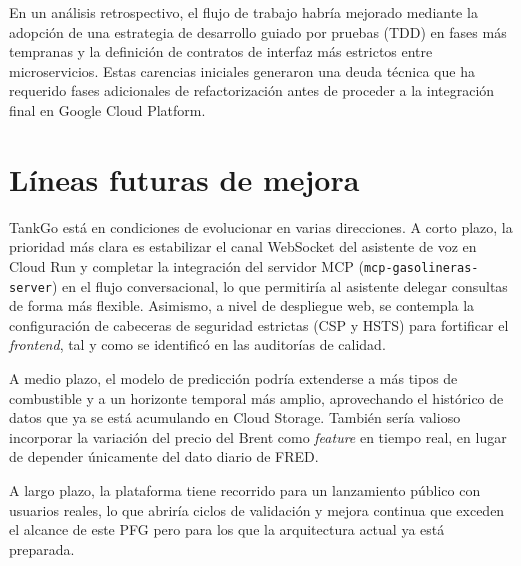 En un análisis retrospectivo, el flujo de trabajo habría mejorado mediante la adopción de una estrategia de desarrollo guiado por pruebas
(TDD) en fases más tempranas y la definición de contratos de interfaz más estrictos entre microservicios. Estas carencias iniciales generaron
una deuda técnica que ha requerido fases adicionales de refactorización antes de proceder a la integración final en Google Cloud Platform.

\section{Líneas futuras de mejora}
\label{sec:lineas-futuras}

TankGo está en condiciones de evolucionar en varias direcciones. A corto plazo, la prioridad más clara es estabilizar el canal WebSocket del
asistente de voz en Cloud Run y completar la integración del servidor MCP (\texttt{mcp-gasolineras-server}) en el flujo conversacional, lo que
permitiría al asistente delegar consultas de forma más flexible. Asimismo, a nivel de despliegue web, se contempla la configuración de cabeceras de
seguridad estrictas (CSP y HSTS) para fortificar el \textit{frontend}, tal y como se identificó en las auditorías de calidad.

A medio plazo, el modelo de predicción podría extenderse a más tipos de combustible y a un horizonte temporal más amplio, aprovechando el histórico
de datos que ya se está acumulando en Cloud Storage. También sería valioso incorporar la variación del precio del Brent como \textit{feature} en
tiempo real, en lugar de depender únicamente del dato diario de FRED.

A largo plazo, la plataforma tiene recorrido para un lanzamiento público con usuarios reales, lo que abriría ciclos de validación y mejora continua
que exceden el alcance de este PFG pero para los que la arquitectura actual ya está preparada.